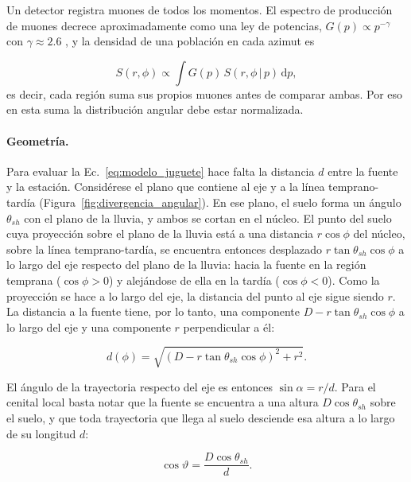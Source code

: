 Un detector registra muones de todos los momentos. El espectro de producción de muones decrece aproximadamente como una ley de potencias, $G(p)\propto p^{-\gamma}$ con $\gamma \approx 2.6$ \cite{Cazon2012}, y la densidad de una población en cada azimut es

\begin{equation}
	S(r,\phi) \propto \int G(p)\,S(r,\phi\,|\,p)\,\mathrm{d}p ,
	\label{eq:poblacion}
\end{equation}
%
es decir, cada región suma sus propios muones antes de comparar ambas. Por eso en esta suma la distribución angular debe estar normalizada.

\paragraph{Geometría.} Para evaluar la Ec.~\ref{eq:modelo_juguete} hace falta la distancia $d$ entre la fuente y la estación. Considérese el plano que contiene al eje y a la línea temprano-tardía (Figura~\ref{fig:divergencia_angular}). En ese plano, el suelo forma un ángulo $\theta_{sh}$ con el plano de la lluvia, y ambos se cortan en el núcleo. El punto del suelo cuya proyección sobre el plano de la lluvia está a una distancia $r\cos\phi$ del núcleo, sobre la línea temprano-tardía, se encuentra entonces desplazado $r\tan\theta_{sh}\cos\phi$ a lo largo del eje respecto del plano de la lluvia: hacia la fuente en la región temprana ($\cos\phi>0$) y alejándose de ella en la tardía ($\cos\phi<0$). Como la proyección se hace a lo largo del eje, la distancia del punto al eje sigue siendo $r$. La distancia a la fuente tiene, por lo tanto, una componente $D - r\tan\theta_{sh}\cos\phi$ a lo largo del eje y una componente $r$ perpendicular a él:

\begin{equation}
	d(\phi) = \sqrt{\left(D - r\tan\theta_{sh}\cos\phi\right)^2 + r^2}.
	\label{eq:distancia_fuente}
\end{equation}

El ángulo de la trayectoria respecto del eje es entonces $\sin\alpha = r/d$. Para el cenital local basta notar que la fuente se encuentra a una altura $D\cos\theta_{sh}$ sobre el suelo, y que toda trayectoria que llega al suelo desciende esa altura a lo largo de su longitud $d$:

\begin{equation}
	\cos\vartheta = \frac{D\cos\theta_{sh}}{d}.
	\label{eq:cenital_modelo}
\end{equation}

